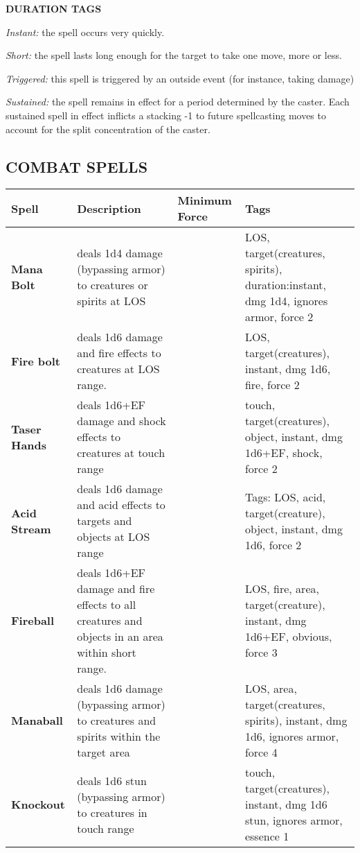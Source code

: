\documentclass[oneside,10pt]{article}
\begin{document}
\begin{multicols}{2}
\textbf{DURATION TAGS}

\begin{dent}

\textit{Instant:} the spell occurs very quickly.

\textit{Short:} the spell lasts long enough for the target to take one
move, more or less.

\textit{Triggered:} this spell is triggered by an outside event (for
instance, taking damage)

\textit{Sustained:} the spell remains in effect for a period determined by the caster. Each sustained spell in effect inflicts a stacking -1 to future spellcasting moves to account for the split concentration of the caster.
\end{dent}
\end{multicols}

\subsection{COMBAT SPELLS}

\begin{tabular}{>{\bfseries}m{.1\linewidth}m{.34\linewidth}>{\bfseries\centering}m{.11\linewidth}m{.35\linewidth}}
Spell& \textbf{Description}&Minimum Force&\textbf{Tags}\\\midrule
Mana Bolt & deals 1d4 damage (bypassing armor) to creatures or spirits at LOS & 2 & LOS, target(creatures, spirits), duration:instant,
dmg 1d4, ignores armor, force 2\\
Fire bolt& deals 1d6 damage and fire effects to creatures at LOS range.& 2 & LOS, target(creatures), instant, dmg 1d6, fire, force 2\\
Taser Hands& deals 1d6+EF damage and shock effects to
creatures at touch range& 2 & touch, target(creatures), object, instant, dmg 1d6+EF, shock,
force 2\\
Acid Stream& deals 1d6 damage and acid effects to targets
and objects at LOS range & 2 &
Tags: LOS, acid, target(creature), object, instant, dmg
1d6, force 2\\
Fireball& deals 1d6+EF damage and fire effects to
all creatures and objects in an area within short
range.& 3 & LOS, fire, area, target(creature), instant, dmg
1d6+EF, obvious, force 3\\
Manaball& deals 1d6 damage (bypassing armor) to creatures
and spirits within the target area&4 & LOS, area, target(creatures, spirits), instant, dmg
1d6, ignores armor, force 4 \\
Knockout& deals 1d6 stun (bypassing armor) to creatures
in touch range& 1 & touch, target(creatures), instant, dmg 1d6 stun, ignores armor,
essence 1\\
\bottomrule
\end{tabular}
\end{document}

